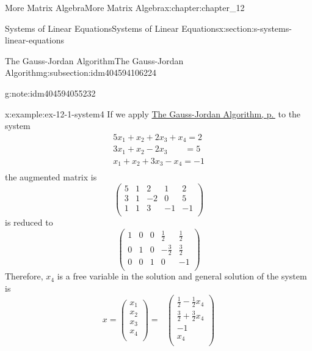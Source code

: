 \documentclass[twoside,10pt,]{book}
\numberwithin{equation}{section}
\begin{document}
\begin{chapterptx}{More Matrix Algebra}{}{More Matrix Algebra}{}{}{x:chapter:chapter_12}
\begin{sectionptx}{Systems of Linear Equations}{}{Systems of Linear Equations}{}{}{x:section:s-systems-linear-equations}
\begin{subsectionptx}{The Gauss-Jordan Algorithm}{}{The Gauss-Jordan Algorithm}{}{}{g:subsection:idm404594106224}
\begin{note}{}{g:note:idm404594055232}
\begin{itemize}[label=\textbullet]
\end{itemize}
%
\end{note}
\begin{example}{}{x:example:ex-12-1-system4}%
If we apply \hyperref[x:algorithm:algorithm-gauss-jordan]{The Gauss-Jordan Algorithm, p.\,\pageref{x:algorithm:algorithm-gauss-jordan}} to the system%
\begin{equation*}
\begin{array}{l}
5 x_1+x_2+2 x_3+x_4=2 \\
3 x_1+x_2-2 x_3\quad \quad=5 \\
x_1+x_2+3 x_3-x_4=-1 \\
\end{array}
\end{equation*}
the augmented matrix is%
\begin{equation*}
\left(
\begin{array}{cccc|c}
5 & 1 & 2 & 1 & 2 \\
3 & 1 & -2 & 0 & 5 \\
1 & 1 & 3 & -1 & -1 \\
\end{array}
\right)
\end{equation*}
is reduced to%
\begin{equation*}
\left(
\begin{array}{cccc|c}
1 & 0 & 0 & \frac{1}{2} & \frac{1}{2} \\
0 & 1 & 0 & -\frac{3}{2} & \frac{3}{2} \\
0 & 0 & 1 & 0 & -1 \\
\end{array}
\right)
\end{equation*}
Therefore, \(x_4\) is a free variable in the solution and general solution of the system is%
\begin{equation*}
x =\left(
\begin{array}{c}
x_1 \\
x_2 \\
x_3 \\
x_4 \\
\end{array}
\right)=\text{  }\left(
\begin{array}{c}
\frac{1}{2}-\frac{1}{2}x_4 \\
\frac{3}{2}+\frac{3}{2}x_4 \\
-1 \\
x_4 \\
\end{array}
\right)
\end{equation*}
%
\par

\end{example}
\end{subsectionptx}
\end{sectionptx}
\end{chapterptx}
\end{document}
